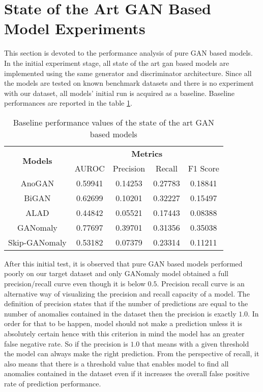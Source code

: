 \section{State of the Art GAN Based Model Experiments}
\label{sec:exp_pure_gan}
This section is devoted to the performance analysis of pure GAN based models. In the initial experiment stage, 
all state of the art gan based models are implemented using the same generator and discriminator architecture. 
Since all the models are tested on known benchmark datasets and there is no experiment with our dataset, all models' 
initial run is acquired as a baseline. Baseline performances are reported in the table \ref{tab:exp_baseline}.

\begin{longtable}[c]{|c|cccc|}
	\caption{Baseline performance values of the state of the art GAN based models}
	\label{tab:exp_baseline}\\
	\hline
	\multirow{2}{*}{\textbf{Models}} & \multicolumn{4}{c|}{\textbf{Metrics}} \\ \cline{2-5} 
	& AUROC & Precision & Recall & F1 Score \\ \hline
	\endhead
 \multicolumn{1}{|c|}{AnoGAN} & \multicolumn{1}{c}{0.59941} & \multicolumn{1}{c}{0.14253} & \multicolumn{1}{c}{0.27783} & \multicolumn{1}{c|}{0.18841} \\ \hline
\multicolumn{1}{|c|}{BiGAN} & \multicolumn{1}{c}{0.62699} & \multicolumn{1}{c}{0.10201} & \multicolumn{1}{c}{0.32227} & \multicolumn{1}{c|}{0.15497} \\ \hline
\multicolumn{1}{|c|}{ALAD} & \multicolumn{1}{c}{0.44842} & \multicolumn{1}{c}{0.05521} & \multicolumn{1}{c}{0.17443} & \multicolumn{1}{c|}{0.08388} \\ \hline
\multicolumn{1}{|c|}{GANomaly} & \multicolumn{1}{c}{0.77697} & \multicolumn{1}{c}{0.39701} & \multicolumn{1}{c}{0.31356} & \multicolumn{1}{c|}{0.35038} \\ \hline
\multicolumn{1}{|c|}{Skip-GANomaly} & \multicolumn{1}{c}{0.53182} & \multicolumn{1}{c}{0.07379} & \multicolumn{1}{c}{0.23314} & \multicolumn{1}{c|}{0.11211} \\ \hline
\end{longtable}

After this initial test, it is observed that pure GAN based models performed poorly on our target dataset and 
only GANomaly model obtained a full precision/recall curve even though it is below $0.5$. Precision recall 
curve is an alternative way of visualizing the precision and recall capacity of a model. The definition of 
precision states that if the number of predictions are equal to the number of anomalies contained in the dataset then the 
precision is exactly $1.0$. In order for that to be happen, model should not make a prediction unless it is 
absolutely certain hence with this criterion in mind the model has an greater false negative rate. So if the 
precision is $1.0$ that means with a given threshold the model can always make the right prediction. From the 
perspective of recall, it also means that there is a threshold value that enables model to find all anomalies 
contained in the dataset even if it increases the overall false positive rate of prediction performance.  

